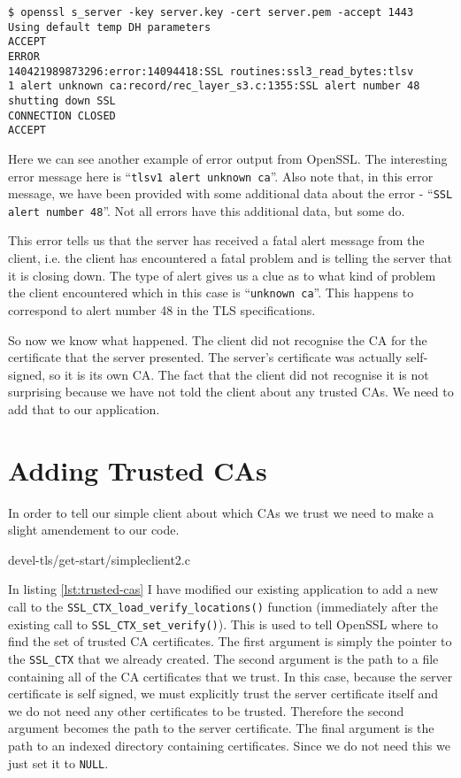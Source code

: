 \begin{verbatim}
$ openssl s_server -key server.key -cert server.pem -accept 1443
Using default temp DH parameters
ACCEPT
ERROR
140421989873296:error:14094418:SSL routines:ssl3_read_bytes:tlsv
1 alert unknown ca:record/rec_layer_s3.c:1355:SSL alert number 48
shutting down SSL
CONNECTION CLOSED
ACCEPT
\end{verbatim}

Here we can see another example of error output from OpenSSL. The interesting 
error message here is ``\verb!tlsv1 alert unknown ca!''. Also note that, in 
this error message, we have been provided with some additional data about the 
error - ``\verb!SSL alert number 48!''. Not all errors have this additional 
data, but some do.

This error tells us that the server has received a fatal alert message from the 
client, i.e. the client has encountered a fatal problem and is telling the 
server that it is closing down. The type of alert gives us a clue as to what 
kind of problem the client encountered which in this case is
``\verb!unknown ca!''. This happens to correspond to alert number 48 in the TLS 
specifications.

So now we know what happened. The client did not recognise the CA for the 
certificate that the server presented. The server's certificate was actually 
self-signed, so it is its own CA. The fact that the client did not recognise it 
is not surprising because we have not told the client about any trusted CAs. We 
need to add that to our application.

\section{Adding Trusted CAs}

In order to tell our simple client about which CAs we trust we need to make a 
slight amendement to our code.


{devel-tls/get-start/simpleclient2.c}

In listing \ref{lst:trusted-cas} I have modified our existing application to add
a new call to the \verb!SSL_CTX_load_verify_locations()! function (immediately
after the existing call to \verb!SSL_CTX_set_verify()!). This is used to tell 
OpenSSL where to find the set of trusted CA certificates. The first argument is
simply the pointer to the \verb!SSL_CTX! that we already created. The second
argument is the path to a file containing all of the CA certificates that we
trust. In this case, because the server certificate is self signed, we must
explicitly trust the server certificate itself and we do not need any other
certificates to be trusted. Therefore the second argument becomes the path to 
the server certificate. The final argument is the path to an indexed directory 
containing certificates. Since we do not need this we just set it to 
\verb!NULL!.

